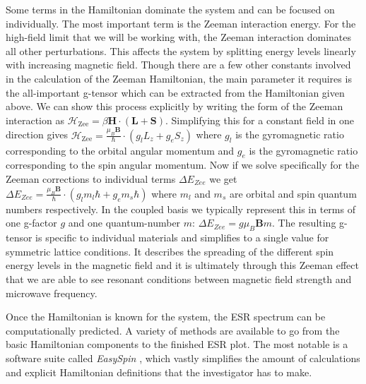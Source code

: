 \documentclass[oneside]{BYUPhys}
\begin{document}
Some terms in the Hamiltonian dominate the system and can be focused on individually. The most important term is the Zeeman interaction energy. For the high-field limit that we will be working with, the Zeeman interaction dominates all other perturbations. This affects the system by splitting energy levels linearly with increasing magnetic field. Though there are a few other constants involved in the calculation of the Zeeman Hamiltonian, the main parameter it requires is the all-important g-tensor which can be extracted from the Hamiltonian given above. We can show this process explicitly by writing the form of the Zeeman interaction as $\mathcal{H}_{\text{Zee}} = \beta \mathbf{H} \cdot (\mathbf{L}+\mathbf{S})$. Simplifying this for a constant field in one direction gives $\mathcal{H}_{\text{Zee}} = \frac{\mu_B\mathbf{B}}{\hbar}\cdot (g_l L_z+g_eS_z)$ where $g_l$ is the gyromagnetic ratio corresponding to the orbital angular momentum and $g_e$ is the gyromagnetic ratio corresponding to the spin angular momentum. Now if we solve specifically for the Zeeman corrections to individual terms $\Delta E_{Zee}$ we get $\Delta E_{Zee}=\frac{\mu_B\mathbf{B}}{\hbar}\cdot (g_lm_l\hbar+g_em_s\hbar)$ where $m_l$ and $m_s$ are orbital and spin quantum numbers respectively. In the coupled basis we typically represent this in terms of one g-factor $g$ and one quantum-number $m$: $\Delta E_{Zee}=g\mu_B\mathbf{B}m$. The resulting g-tensor is specific to individual materials and simplifies to a single value for symmetric lattice conditions. It describes the spreading of the different spin energy levels in the magnetic field and it is ultimately through this Zeeman effect that we are able to see resonant conditions between magnetic field strength and microwave frequency.

Once the Hamiltonian is known for the system, the ESR spectrum can be computationally predicted. A variety of methods are available to go from the basic Hamiltonian components to the finished ESR plot. The most notable is a software suite called \textit{EasySpin} \cite{RefWorks:doc:58929a02e4b0d4c09201f91b}, which vastly simplifies the amount of calculations and explicit Hamiltonian definitions that the investigator has to make.
\end{document}
